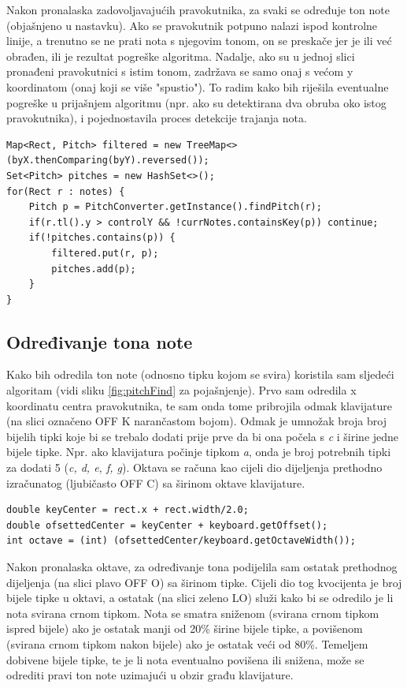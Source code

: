 \documentclass[times, utf8, zavrsni, numeric]{fer}
\begin{document}
Nakon pronalaska zadovoljavajućih pravokutnika, za svaki se određuje ton note (objašnjeno u nastavku). Ako se pravokutnik potpuno nalazi ispod kontrolne linije, a trenutno se ne prati nota s njegovim tonom, on se preskače jer je ili već obrađen, ili je rezultat pogreške algoritma. Nadalje, ako su u jednoj slici pronađeni pravokutnici s istim tonom, zadržava se samo onaj s većom y koordinatom (onaj koji se više "spustio"). To radim kako bih riješila eventualne pogreške u prijašnjem algoritmu (npr. ako su detektirana dva obruba oko istog pravokutnika), i pojednostavila proces detekcije trajanja nota.

\begin{lstlisting}
Map<Rect, Pitch> filtered = new TreeMap<>(byX.thenComparing(byY).reversed());
Set<Pitch> pitches = new HashSet<>();
for(Rect r : notes) {
	Pitch p = PitchConverter.getInstance().findPitch(r);
	if(r.tl().y > controlY && !currNotes.containsKey(p)) continue;
	if(!pitches.contains(p)) {
		filtered.put(r, p);
		pitches.add(p);
	}
}
\end{lstlisting}

\subsection{Određivanje tona note}
Kako bih odredila ton note (odnosno tipku kojom se svira) koristila sam sljedeći algoritam (vidi sliku \ref{fig:pitchFind} za pojašnjenje). Prvo sam odredila x koordinatu centra pravokutnika, te sam onda tome pribrojila odmak klavijature (na slici označeno OFF K narančastom bojom). Odmak je umnožak broja broj bijelih tipki koje bi se trebalo dodati prije prve da bi ona počela s \textit{c} i širine jedne bijele tipke. Npr. ako klavijatura počinje tipkom \textit{a}, onda je broj potrebnih tipki za dodati 5 (\textit{c, d, e, f, g}). Oktava se računa kao cijeli dio dijeljenja prethodno izračunatog (ljubičasto OFF C) sa širinom oktave klavijature.

\begin{lstlisting}
double keyCenter = rect.x + rect.width/2.0;
double ofsettedCenter = keyCenter + keyboard.getOffset();
int octave = (int) (ofsettedCenter/keyboard.getOctaveWidth());
\end{lstlisting}

Nakon pronalaska oktave, za određivanje tona podijelila sam ostatak prethodnog dijeljenja (na slici plavo OFF O) sa širinom tipke. Cijeli dio tog kvocijenta je broj bijele tipke u oktavi, a ostatak (na slici zeleno LO) služi kako bi se odredilo je li nota svirana crnom tipkom. Nota se smatra sniženom (svirana crnom tipkom ispred bijele) ako je ostatak manji od 20\% širine bijele tipke, a povišenom (svirana crnom tipkom nakon bijele) ako je ostatak veći od 80\%. Temeljem dobivene bijele tipke, te je li nota eventualno povišena ili snižena, može se odrediti pravi ton note uzimajući u obzir građu klavijature.
\end{document}
